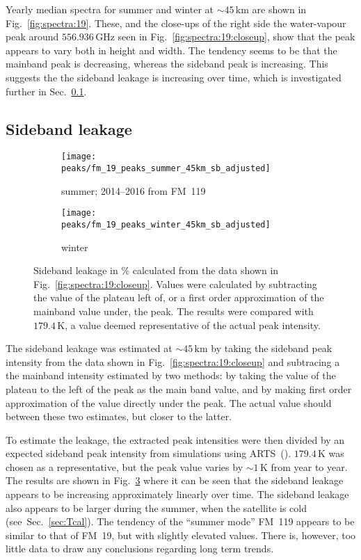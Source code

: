 \noindent
Yearly median spectra for summer and winter at $\sim45\,\mathrm{km}$ are shown
in Fig.~\ref{fig:spectra:19}.  These, and the close-ups of the right side the
water-vapour peak around $556.936\,\mathrm{GHz}$ seen in
Fig.~\ref{fig:spectra:19:closeup}, show that the peak appears to vary both in
height and width.  The tendency seems to be that the mainband peak is
decreasing, whereas the sideband peak is increasing.  This suggests the the
sideband leakage is increasing over time, which is investigated further in
Sec.~\ref{FM19:sbl}.


\subsection{Sideband leakage}
\label{FM19:sbl}

\begin{figure}[ht]
    \centering
    \begin{subfigure}[b]{0.9545\textwidth}
        \texttt{[image: peaks/fm\_19\_peaks\_summer\_45km\_sb\_adjusted]}
        \caption{summer; 2014--2016 from FM~119
            }\label{fig:sbl:19:summer}
    \end{subfigure}
    \begin{subfigure}[b]{0.9545\textwidth}
        \texttt{[image: peaks/fm\_19\_peaks\_winter\_45km\_sb\_adjusted]}
        \caption{winter}\label{fig:sbl:19:winter}
    \end{subfigure}
    \caption{Sideband leakage in \% calculated from the data shown in
        Fig.~\ref{fig:spectra:19:closeup}.  Values were calculated by
        subtracting the value of the plateau left of, or a first order
        approximation of the mainband value under, the peak.  The results were
        compared with $179.4\,\mathrm{K}$, a value deemed representative of the
        actual peak intensity.
        }\label{fig:sbl:19}
\end{figure}

\noindent
The sideband leakage was estimated at $\sim45\,\mathrm{km}$ by taking the
sideband peak intensity from the data shown in
Fig.~\ref{fig:spectra:19:closeup} and subtracing a the mainband intensity
estimated by two methods:  by taking the value of the plateau to the left of
the peak as the main band value, and by making first order approximation of the
value directly under the peak.  The actual value should between these two
estimates, but closer to the latter.

To estimate the leakage, the extracted peak intensities were then divided by an
expected sideband peak intensity from simulations using
ARTS~(\cite{buehler:artst:05}).  $179.4\,\mathrm{K}$ was chosen as a
representative, but the peak value varies by $\sim1\,\mathrm{K}$ from year to
year.  The results are shown in Fig.~\ref{fig:sbl:19} where it can be seen that
the sideband leakage appears to be increasing approximately linearly over time.
The sideband leakage also appears to be larger during the summer, when the
satellite is cold (see~Sec.~\ref{sec:Tcal}).  The tendency of the ``summer
mode'' FM~119 appears to be similar to that of FM~19, but with slightly
elevated values.  There is, however, too little data to draw any conclusions
regarding long term trends.


